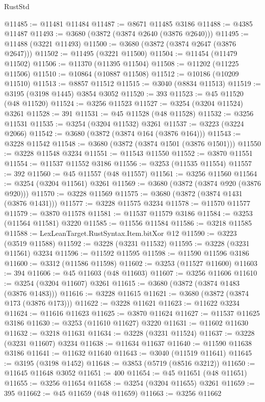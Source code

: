 \begin{lexlean}{RustStd}
\begin{coremodule}
@11485 := @11481 @11484
@11487 := @8671 @11485 @3186
@11488 := @4385 @11487
@11493 := @3680 (@3872 (@3874 @2640 (@3876 @2640)))
@11495 := @11488 (@3221 @11493)
@11500 := @3680 (@3872 (@3874 @2647 (@3876 @2647)))
@11502 := @11495 (@3221 @11500)
@11504 := @11454 (@11479 @11502)
@11506 := @11370 (@11395 @11504)
@11508 := @11202 (@11225 @11506)
@11510 := @10864 (@10887 @11508)
@11512 := @10186 (@10209 @11510)
@11513 := @8857 @11512
@11515 := @3040 (@8834 @11513)
@11519 := @3195 (@3198 @1445) @3854 @3052
@11520 := 393
@11523 := @45 @11520 (@48 @11520)
@11524 := @3256 @11523
@11527 := @3254 (@3204 @11524) @3261
@11528 := 391
@11531 := @45 @11528 (@48 @11528)
@11532 := @3256 @11531
@11535 := @3254 (@3204 @11532) @3261
@11537 := @3223 (@3224 @2066)
@11542 := @3680 (@3872 (@3874 @164 (@3876 @164)))
@11543 := @3228 @11542
@11548 := @3680 (@3872 (@3874 @1501 (@3876 @1501)))
@11550 := @3228 @11548 @3234
@11551 := @11543 @11550
@11552 := @3870 @11551
@11554 := @11537 @11552 @3186
@11556 := @3253 (@11535 @11554)
@11557 := 392
@11560 := @45 @11557 (@48 @11557)
@11561 := @3256 @11560
@11564 := @3254 (@3204 @11561) @3261
@11569 := @3680 (@3872 (@3874 @920 (@3876 @920)))
@11570 := @3228 @11569
@11575 := @3680 (@3872 (@3874 @1431 (@3876 @1431)))
@11577 := @3228 @11575 @3234
@11578 := @11570 @11577
@11579 := @3870 @11578
@11581 := @11537 @11579 @3186
@11584 := @3253 (@11564 @11581) @3220
@11585 := @11556 @11584
@11586 := @3218 @11585
@11588 := LexLeanTarget.RustSyntax.Item.bitXor @12
@11590 := @3223 (@3519 @11588)
@11592 := @3228 (@3231 @11532)
@11595 := @3228 (@3231 @11561) @3234
@11596 := @11592 @11595
@11598 := @11590 @11596 @3186
@11600 := @3312 (@11586 @11598)
@11602 := @3253 (@11527 @11600)
@11603 := 394
@11606 := @45 @11603 (@48 @11603)
@11607 := @3256 @11606
@11610 := @3254 (@3204 @11607) @3261
@11615 := @3680 (@3872 (@3874 @1483 (@3876 @1483)))
@11616 := @3228 @11615
@11621 := @3680 (@3872 (@3874 @173 (@3876 @173)))
@11622 := @3228 @11621
@11623 := @11622 @3234
@11624 := @11616 @11623
@11625 := @3870 @11624
@11627 := @11537 @11625 @3186
@11630 := @3253 (@11610 @11627) @3220
@11631 := @11602 @11630
@11632 := @3218 @11631
@11634 := @3228 (@3231 @11524)
@11637 := @3228 (@3231 @11607) @3234
@11638 := @11634 @11637
@11640 := @11590 @11638 @3186
@11641 := @11632 @11640
@11643 := @3040 (@11519 @11641)
@11645 := @3195 (@3198 @1452)
@11648 := @3853 (@5719 (@8516 @3212))
@11650 := @11645 @11648 @3052
@11651 := 400
@11654 := @45 @11651 (@48 @11651)
@11655 := @3256 @11654
@11658 := @3254 (@3204 @11655) @3261
@11659 := 395
@11662 := @45 @11659 (@48 @11659)
@11663 := @3256 @11662

\end{coremodule}
\end{lexlean}
